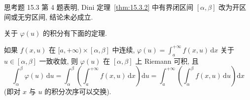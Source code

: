 \begin{remark}\label{rem:15.3.1}
思考题 15.3 第 4 题表明, Dini 定理~\ref{thm:15.3.2} 中有界闭区间 $[\alpha,\beta]$ 改为开区间或无穷区间, 结论未必成立.
\end{remark}

关于 $\varphi(u)$ 的积分有下面的定理.

\begin{theorem}[有穷积分号与无穷积分号可交换]\label{thm:15.3.3}
如果 $f(x,u)$ 在 $[a,+\infty)\times[\alpha,\beta]$ 中连续, $\varphi(u)=\displaystyle\int_{a}^{+\infty}f(x,u)\,\mathrm{d}x$ 关于 $u\in[\alpha,\beta]$ 一致收敛, 则 $\varphi(u)$ 在 $[\alpha,\beta]$ 上 Riemann 可积, 且
\[
  \int_{\alpha}^{\beta}\varphi(u)\,\mathrm{d}u=\int_{\alpha}^{\beta}\left(\int_{a}^{+\infty}f(x,u)\,\mathrm{d}x\right)\mathrm{d}u=\int_{a}^{+\infty}\left(\int_{\alpha}^{\beta}f(x,u)\,\mathrm{d}u\right)\mathrm{d}x
\]
(即对 $x$ 与 $u$ 的积分次序可以交换).
\end{theorem}

